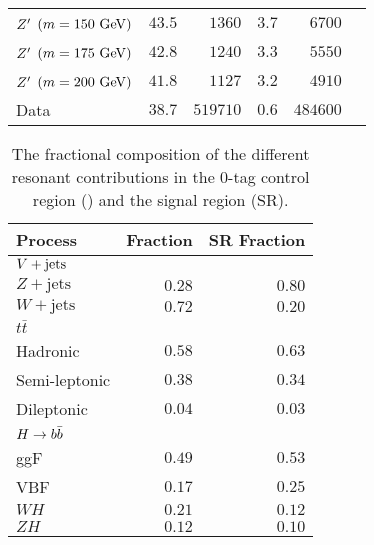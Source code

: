\begin{table}[htpb]
\begin{adjustbox}{max width=\textwidth}
\begin{tabular}{@{}lrrrrr@{}}
   $Z'$ $\left(m=150~\mathrm{GeV}\right)$ & $43.5$               & $1360$                       & $3.7$          & $6700$                  \\
   $Z'$ $\left(m=175~\mathrm{GeV}\right)$ & $42.8$               & $1240$                       & $3.3$          & $5550$                  \\
   $Z'$ $\left(m=200~\mathrm{GeV}\right)$ & $41.8$               & $1127$                       & $3.2$          & $4910$                  \\
   Data                                & $38.7$               & $519710$                     & $0.6$          & $484600$                \\
   \bottomrule
  \end{tabular}
 \end{adjustbox}
 \label{table:efficiencies_and_yields}
\end{table}

\begin{table}[htpb]
 \centering
 \caption[The fractional composition of the different resonant contributions in the $0$-tag control region and signal region.]{%
  The fractional composition of the different resonant contributions in the $0$-tag control region (\CRQCD{}) and the signal region (SR).}
 \begin{tabular}{@{}lrr@{}}
  \toprule
  Process                                   & \CRQCD{} Fraction & SR Fraction \\ \midrule
  $\Vjets$                                  &                   &             \\
  \phantom{$\Vjets$\quad} $Z+\mathrm{jets}$ & $0.28$            & $0.80$      \\
  \phantom{$\Vjets$\quad} $W+\mathrm{jets}$ & $0.72$            & $0.20$      \\
  $t\bar{t}$                                &                   &             \\
  \phantom{$t\bar{t}$\quad} Hadronic        & $0.58$            & $0.63$      \\
  \phantom{$t\bar{t}$\quad} Semi-leptonic   & $0.38$            & $0.34$      \\
  \phantom{$t\bar{t}$\quad} Dileptonic      & $0.04$            & $0.03$      \\
  $\Hbb$                                    &                   &             \\
  \phantom{$\Hbb$\quad} ggF                 & $0.49$            & $0.53$      \\
  \phantom{$\Hbb$\quad} VBF                 & $0.17$            & $0.25$      \\
  \phantom{$\Hbb$\quad} $WH$                & $0.21$            & $0.12$      \\
  \phantom{$\Hbb$\quad} $ZH$                & $0.12$            & $0.10$      \\
  \bottomrule
 \end{tabular}
 \label{table:fractional_composition}
\end{table}

